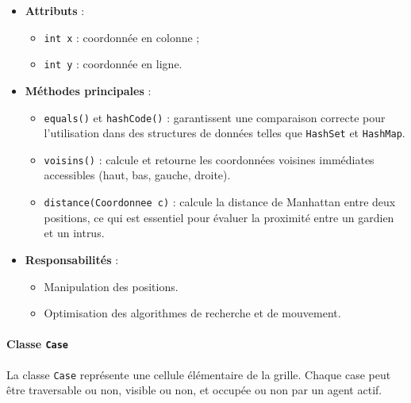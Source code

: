 \begin{itemize}
    \item \textbf{Attributs} :
    \begin{itemize}
        \item \texttt{int x} : coordonnée en colonne ;
        \item \texttt{int y} : coordonnée en ligne.
    \end{itemize}
    \item \textbf{Méthodes principales} :
    \begin{itemize}
        \item \texttt{equals()} et \texttt{hashCode()} : garantissent une comparaison correcte pour l’utilisation dans des structures de données telles que \texttt{HashSet} et \texttt{HashMap}.
        \item \texttt{voisins()} : calcule et retourne les coordonnées voisines immédiates accessibles (haut, bas, gauche, droite).
        \item \texttt{distance(Coordonnee c)} : calcule la distance de Manhattan entre deux positions, ce qui est essentiel pour évaluer la proximité entre un gardien et un intrus.
    \end{itemize}
    \item \textbf{Responsabilités} :
    \begin{itemize}
        \item Manipulation des positions.
        \item Optimisation des algorithmes de recherche et de mouvement.
    \end{itemize}
\end{itemize}

\vspace{1em}

\paragraph{Classe \texttt{Case}}

La classe \texttt{Case} représente une cellule élémentaire de la grille. Chaque case peut être traversable ou non, visible ou non, et occupée ou non par un agent actif.

